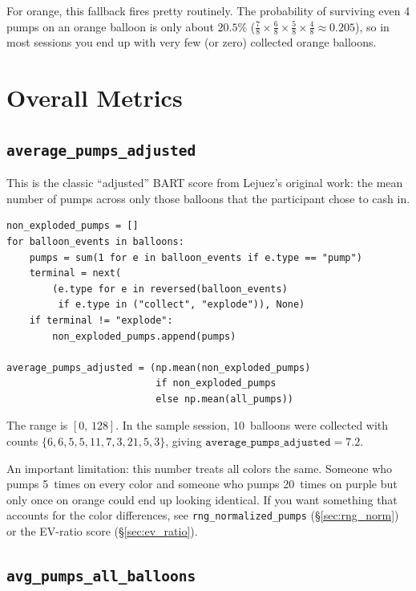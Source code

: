 \documentclass[11pt,a4paper]{article}
\begin{document}
For orange, this fallback fires pretty routinely. The probability of surviving even
4 pumps on an orange balloon is only about $20.5\%$
($\frac{7}{8} \times \frac{6}{8} \times \frac{5}{8} \times \frac{4}{8} \approx 0.205$),
so in most sessions you end up with very few (or zero) collected orange balloons.


\section{Overall Metrics}

\subsection{\texttt{average\_pumps\_adjusted}}

This is the classic ``adjusted'' BART score from Lejuez's original work: the mean
number of pumps across only those balloons that the participant chose to cash in.

\begin{lstlisting}[style=pythonstyle]
non_exploded_pumps = []
for balloon_events in balloons:
    pumps = sum(1 for e in balloon_events if e.type == "pump")
    terminal = next(
        (e.type for e in reversed(balloon_events)
         if e.type in ("collect", "explode")), None)
    if terminal != "explode":
        non_exploded_pumps.append(pumps)

average_pumps_adjusted = (np.mean(non_exploded_pumps)
                          if non_exploded_pumps
                          else np.mean(all_pumps))
\end{lstlisting}

The range is $[0,\, 128]$.  In the sample session, 10~balloons were collected
with counts $\{6, 6, 5, 5, 11, 7, 3, 21, 5, 3\}$, giving
$\texttt{average\_pumps\_adjusted} = 7.2$.

An important limitation: this number treats all colors the same. Someone who
pumps 5~times on every color and someone who pumps 20~times on purple but only
once on orange could end up looking identical. If you want something that
accounts for the color differences, see \texttt{rng\_normalized\_pumps}
(\S\ref{sec:rng_norm}) or the EV-ratio score (\S\ref{sec:ev_ratio}).


\subsection{\texttt{avg\_pumps\_all\_balloons}}
\end{document}
